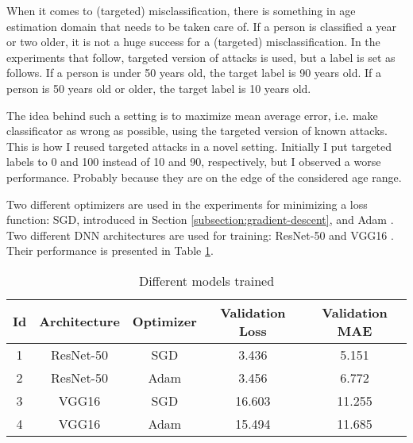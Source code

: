 When it comes to (targeted) misclassification, there is something in age estimation domain that needs to be taken care of. If a person is classified a year or two older, it is not a huge success for a (targeted) misclassification. In the experiments that follow, targeted version of attacks is used, but a label is set as follows. If a person is under 50 years old, the target label is 90 years old. If a person is 50 years old or older, the target label is 10 years old. 

The idea behind such a setting is to maximize mean average error, i.e. make classificator as wrong as possible, using the targeted version of known attacks.  This is how I reused targeted attacks in a novel setting. Initially I put targeted labels to 0 and 100 instead of 10 and 90, respectively, but I observed a worse performance. Probably because they are on the edge of the considered age range.

Two different optimizers are used in the experiments for minimizing a loss function: SGD, introduced in Section \ref{subsection:gradient-descent}, and Adam \cite{DBLP:journals/corr/KingmaB14}. Two different DNN architectures are used for training: ResNet-50 \cite{DBLP:journals/corr/HeZRS15} and VGG16 \cite{DBLP:journals/corr/SimonyanZ14a}. Their performance is presented in Table \ref{table:trained-models}.

\begin{table}[]
\centering
\begin{tabular}{|c|c|c|c|c|}
\hline
Id & Architecture & Optimizer & Validation Loss & \textbf{Validation MAE} \\ \hline
1 & ResNet-50 & SGD & 3.436 & 5.151 \\ \hline
2 & ResNet-50 & Adam & 3.456 & 6.772 \\ \hline
3 & VGG16 & SGD & 16.603 & 11.255 \\ \hline
4 & VGG16 & Adam & 15.494 & 11.685 \\ \hline
\end{tabular}
\caption{Different models trained}
\label{table:trained-models}
\end{table}

